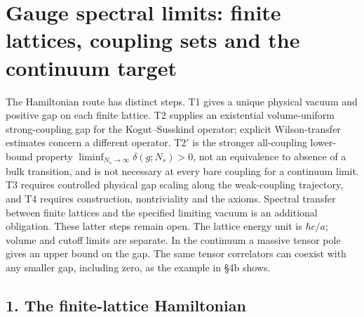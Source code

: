 \documentclass[11pt,a4paper]{article}
\begin{document}
\section{Gauge spectral limits: finite lattices, coupling sets and the
continuum
target}\label{gauge-spectral-limits-finite-lattices-coupling-sets-and-the-continuum-target}

The Hamiltonian route has distinct steps. T1 gives a unique physical
vacuum and positive gap on each finite lattice. T2 supplies an
existential volume-uniform strong-coupling gap for the Kogut--Susskind
operator; explicit Wilson-transfer estimates concern a different
operator. T2\('\) is the stronger all-coupling lower-bound property
\(\liminf_{N_s\to\infty}\delta(g;N_s)>0\), not an equivalence to absence
of a bulk transition, and is not necessary at every bare coupling for a
continuum limit. T3 requires controlled physical gap scaling along the
weak-coupling trajectory, and T4 requires construction, nontriviality
and the axioms. Spectral transfer between finite lattices and the
specified limiting vacuum is an additional obligation. These latter
steps remain open. The lattice energy unit is \(\hbar c/a\); volume and
cutoff limits are separate. In the continuum a massive tensor pole gives
an upper bound on the gap. The same tensor correlators can coexist with
any smaller gap, including zero, as the example in §4b shows.

\subsection{1. The finite-lattice
Hamiltonian}\label{the-finite-lattice-hamiltonian}
\end{document}
